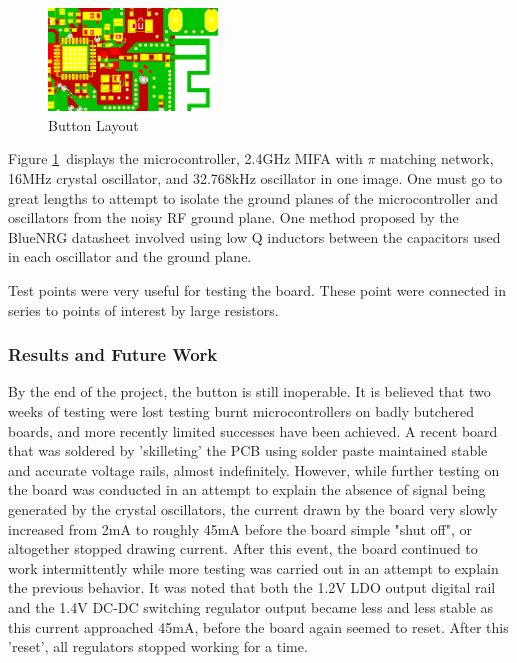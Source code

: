 \documentclass[journal,compsoc]{IEEEtran}
\begin{document}
\begin{figure}[H]
\centering
\includegraphics[width=0.4\textwidth]{button_ship_nice.PNG}
\caption{Button Layout}
\label{buttlay}
\end{figure}

Figure \ref{buttlay}~displays the microcontroller, 2.4GHz MIFA with $\pi$ matching network, 16MHz crystal oscillator, and 32.768kHz oscillator in one image. One must go to great lengths to attempt to isolate the ground planes of the microcontroller and oscillators from the noisy RF ground plane.  One method proposed by the BlueNRG datasheet involved using low Q inductors between the capacitors used in each oscillator and the ground plane.

Test points were very useful for testing the board. These point were connected in series to points of interest by large resistors.

\subsubsection{Results and Future Work}

By the end of the project, the button is still inoperable. It is believed that two weeks of testing were lost testing burnt microcontrollers on badly butchered boards, and more recently limited successes have been achieved.  A recent board that was soldered by 'skilleting' the PCB using solder paste maintained stable and accurate voltage rails, almost indefinitely.  However, while further testing on the board was conducted in an attempt to explain the absence of signal being generated by the crystal oscillators, the current drawn by the board very slowly increased from 2mA to roughly 45mA before the board simple "shut off", or altogether stopped drawing current. After this event, the board continued to work intermittently while more testing was carried out in an attempt to explain the previous behavior. It was noted that both the 1.2V LDO output digital rail and the 1.4V DC-DC switching regulator output became less and less stable as this current approached 45mA, before the board again seemed to reset. After this 'reset', all regulators stopped working for a time. 
\end{document}
